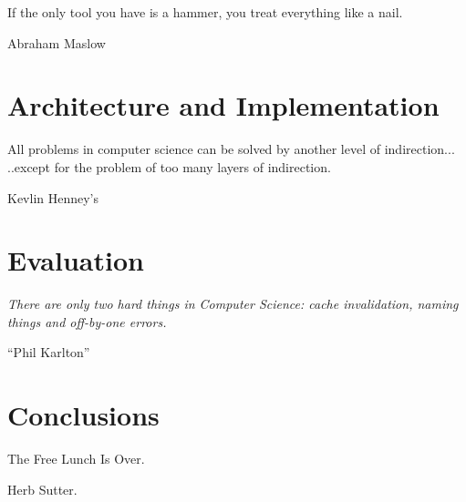 \documentclass[12pt,openright,twoside]{report}
\newcommand{\LIMPA}{
\newpage
\mbox{}
\thispagestyle{empty}
}
\begin{document}
\epigraph{If the only tool you have is a hammer, you treat everything like a nail.}{Abraham Maslow}
\glsresetall

\endgroup
\LIMPA
\chapter{Architecture and Implementation}\label{chapter:3}
\epigraph{All problems in computer science can be solved by another level of indirection... ..except for the problem of too many layers of indirection.}{Kevlin Henney's}
\begingroup
\renewcommand{\cleardoublepage}{}
\renewcommand{\clearpage}{}
\glsresetall

\endgroup
\LIMPA

\chapter{Evaluation}\label{chapter:4}
\begingroup
\renewcommand{\cleardoublepage}{}
\renewcommand{\clearpage}{}
\epigraph{\emph{There are only two hard things in Computer Science: cache invalidation, naming things and off-by-one errors.}}{``Phil Karlton''}



\glsresetall
 
\endgroup
\LIMPA

\chapter{Conclusions}\label{chapter:5}
\begingroup
\renewcommand{\cleardoublepage}{}
\renewcommand{\clearpage}{}
\epigraph{The Free Lunch Is Over.}{Herb Sutter.}

\glsresetall



\endgroup
\LIMPA

\appendix


\end{document}

